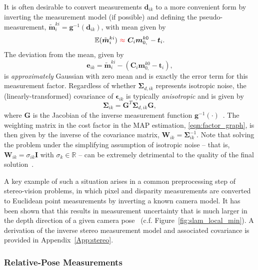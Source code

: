 \documentclass[lettersize,journal]{IEEEtran}
\newcommand{\rev}[1]{\color{red}{#1}\color{black}}
\begin{document}
It is often desirable to convert measurements $ \bm{d}_{ik} $ to a more convenient form by inverting the measurement model (if possible) and defining the pseudo-measurement, $\tilde{\bm{m}}_i^{ki} = \bm{g}^{-1}(\bm{d}_{ik})$, with \rev{approximate } mean given by
\begin{equation*}
	\mathbb{E}(\tilde{\bm{m}}_i^{ki})~\rev{\approx}~\bm{C}_i\bm{m}_{0,}^{k0} - \bm{t}_i.
\end{equation*} 
The deviation from the mean, given by
\begin{equation}\label{eqn:lm_error_term}
	\bm{e}_{ik} = \tilde{\bm{m}}_i^{ki} - (\bm{C}_i\bm{m}_{0,}^{k0} - \bm{t}_i),
\end{equation}
is \emph{approximately} Gaussian with zero mean and is exactly the error term for this measurement factor. Regardless of whether $ \bm{\Sigma}_{d,ik} $ represents isotropic noise, the (linearly-transformed) covariance of $\bm{\epsilon}_{ik} $ is typically \textit{anisotropic} and is given by
\begin{equation}
	\bm{\Sigma}_{ik} = \bm{G}^T \bm{\Sigma}_{d,ik} \bm{G},
\end{equation}
where $\bm{G}$ is the Jacobian of the inverse measurement function $\bm{g}^{-1}(\cdot)$~\cite{matthiesErrorModelingStereo1987}. 
The weighting matrix in the cost factor in the MAP estimation, \eqref{eqn:factor_graph}, is then given by the inverse of the covariance matrix, $ \bm{W}_{ik} = \bm{\Sigma}^{-1}_{ik} $. Note that solving the problem under the simplifying assumption of isotropic noise -- that is, $ \bm{W}_{ik} = \sigma_{ik} \bm{I}$ with $ \sigma_k \in \mathbb{R}$ -- can be extremely detrimental to the quality of the final solution~\cite{matthiesErrorModelingStereo1987,maimoneTwoYearsVisual2007}. 

A key example of such a situation arises in a common preprocessing step of stereo-vision problems, in which pixel and disparity measurements are converted to Euclidean point measurements by inverting a known camera model.  It has been shown that this results in measurement uncertainty that is much larger in the depth direction of a given camera pose~\cite{matthiesErrorModelingStereo1987,barfootPoseEstimationUsing2011} (c.f. Figure~\ref{fig:slam_local_min}). A derivation of the inverse stereo measurement model and associated covariance is provided in Appendix~\ref{App:stereo}. 

\subsubsection{Relative-Pose Measurements}\label{sec:RelPoseMeas}
\end{document}
